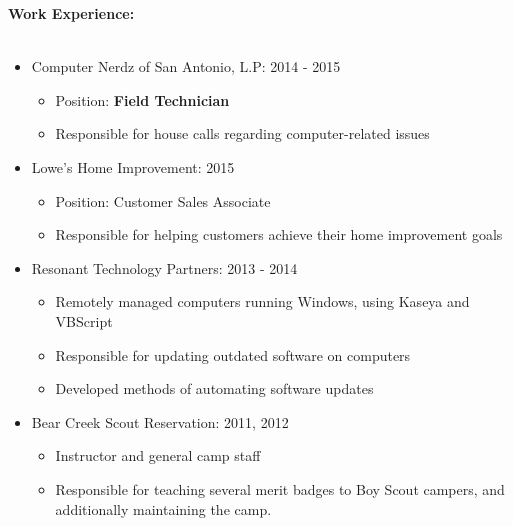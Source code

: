 \documentclass[12pt]{article}
\begin{document}
\begin{flushleft}
\begin{itemize}
\end{itemize}
\textbf{Work Experience:}\\
\vspace{-11pt}\hrulefill\\\vspace{-1.1mm}
\begin{itemize}\vspace{-0mm}
\item Computer Nerdz of San Antonio, L.P: \hfill 2014 - 2015\\
	\begin{itemize}
	\item Position: \textbf{Field Technician}\\
	\item Responsible for house calls regarding computer-related issues\\
	\end{itemize}
\item Lowe's Home Improvement: \hfill 2015\\
	\begin{itemize}
	\item Position: Customer Sales Associate\\
	\item Responsible for helping customers achieve their home improvement goals\\
	\end{itemize}
\item Resonant Technology Partners: \hfill 2013 - 2014\\
	\begin{itemize}
	\item Remotely managed computers running Windows, using Kaseya and VBScript
	\item Responsible for updating outdated software on computers
	\item Developed methods of automating software updates
	\end{itemize}
\item Bear Creek Scout Reservation: \hfill 2011, 2012\\
	\begin{itemize}
	\item Instructor and general camp staff
	\item Responsible for teaching several merit badges to Boy Scout campers, and additionally maintaining the camp.
	\end{itemize}
\end{itemize}


\end{flushleft}
\end{document}
